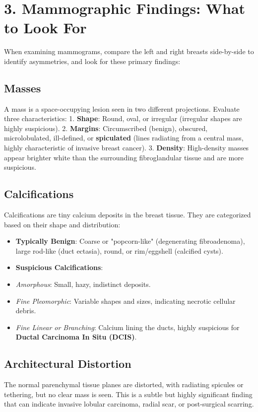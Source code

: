 \section*{3. Mammographic Findings: What to Look For}
When examining mammograms, compare the left and right breasts side-by-side to identify asymmetries, and look for these primary findings:

\subsection*{Masses}
A mass is a space-occupying lesion seen in two different projections. Evaluate three characteristics:
1. \textbf{Shape}: Round, oval, or irregular (irregular shapes are highly suspicious).
2. \textbf{Margins}: Circumscribed (benign), obscured, microlobulated, ill-defined, or \textbf{spiculated} (lines radiating from a central mass, highly characteristic of invasive breast cancer).
3. \textbf{Density}: High-density masses appear brighter white than the surrounding fibroglandular tissue and are more suspicious.

\subsection*{Calcifications}
Calcifications are tiny calcium deposits in the breast tissue. They are categorized based on their shape and distribution:
\begin{itemize}
    \item \textbf{Typically Benign}: Coarse or "popcorn-like" (degenerating fibroadenoma), large rod-like (duct ectasia), round, or rim/eggshell (calcified cysts).
    \item \textbf{Suspicious Calcifications}:
    \item \textit{Amorphous}: Small, hazy, indistinct deposits.
    \item \textit{Fine Pleomorphic}: Variable shapes and sizes, indicating necrotic cellular debris.
    \item \textit{Fine Linear or Branching}: Calcium lining the ducts, highly suspicious for \textbf{Ductal Carcinoma In Situ (DCIS)}.
\end{itemize}

\subsection*{Architectural Distortion}
The normal parenchymal tissue planes are distorted, with radiating spicules or tethering, but no clear mass is seen. This is a subtle but highly significant finding that can indicate invasive lobular carcinoma, radial scar, or post-surgical scarring.


